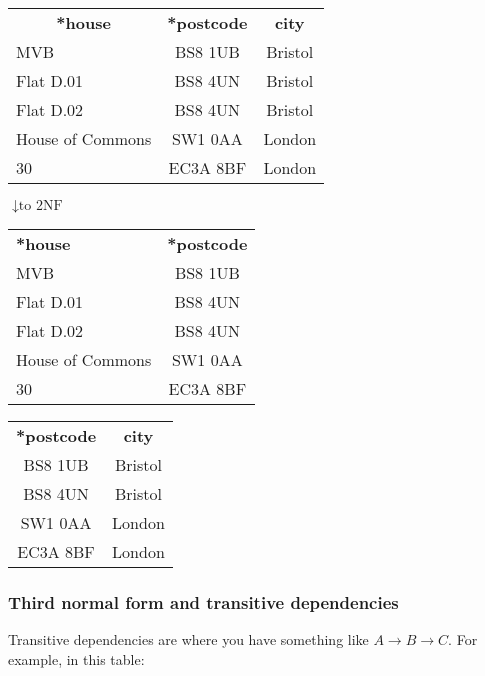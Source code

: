 \documentclass[11pt,a4paper,titlepage,dvipsnames,cmyk]{scrartcl}
\begin{document}
\begin{center}
    \begin{tabular}{|l|c|c|}
        \hline
        \multicolumn{1}{|c|}{\textbf{*house}} & \textbf{*postcode} & 
        \textbf{city} \\ \hhline{|=|=|=|}
        MVB & BS8 1UB & Bristol \\ \hline
        Flat D.01 & BS8 4UN & Bristol \\ \hline
        Flat D.02 & BS8 4UN & Bristol \\ \hline
        House of Commons & SW1 0AA & London \\ \hline
        30 & EC3A 8BF & London \\ \hline
    \end{tabular}

    $\downarrow{\text{to 2NF}}$

    \begin{tabular}{|l|c|}
        \hline
        \textbf{*house} & \textbf{*postcode} \\ \hhline{|=|=|}
        MVB & BS8 1UB \\ \hline
        Flat D.01 & BS8 4UN \\ \hline
        Flat D.02 & BS8 4UN \\ \hline
        House of Commons & SW1 0AA \\ \hline
        30 & EC3A 8BF \\ \hline
    \end{tabular}
    \quad
    \begin{tabular}{|c|c|}
        \hline
        \textbf{*postcode} & \textbf{city} \\ \hhline{|=|=|}
        BS8 1UB & Bristol \\ \hline
        BS8 4UN & Bristol \\ \hline
        SW1 0AA & London \\ \hline
        EC3A 8BF & London \\ \hline
    \end{tabular}
\end{center}

\subsubsection{Third normal form and transitive dependencies}%
\label{ssub:3nf}


Transitive dependencies are where you have something like $A \rightarrow B
\rightarrow C$. For example, in this table:
\end{document}
